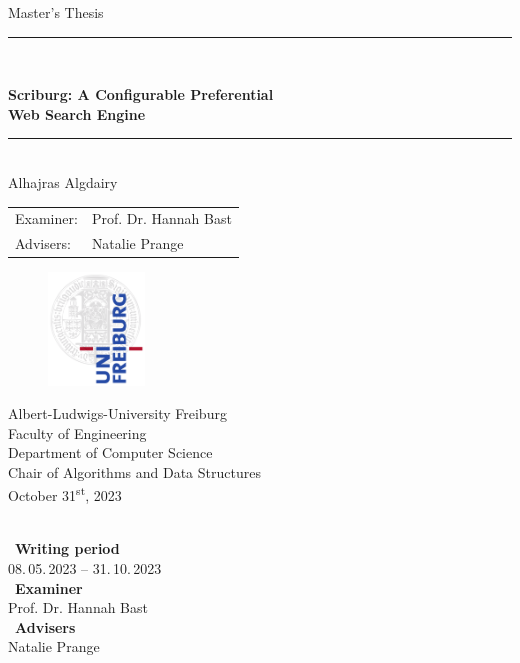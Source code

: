 
\begin{titlepage}
\begin{center}

\newcommand{\HorizontalLine}{\rule{\linewidth}{0.3mm}}

{\Large Master's Thesis}\\[1cm]


\HorizontalLine \\[0.4cm]
\begin{spacing}{3}
    {\huge \bfseries Scriburg: A Configurable Preferential} \\
    {\huge \bfseries  Web Search Engine} \\
\end{spacing}
\HorizontalLine \\[1.5cm]


{\Huge Alhajras Algdairy} \\[1cm]


\begin{tabular}[hc]{>{\huge}l >{\huge}l}
  Examiner: & Prof. Dr. Hannah Bast \\[0.3cm]
  Advisers: & Natalie Prange \\[0.5cm]
\end{tabular}

\begin{figure}[h]	
     \centering
         \includegraphics[height=3cm]{figures/freiburg.png}
\end{figure}

\vfill  %

\Large {
    Albert-Ludwigs-University Freiburg\\
    Faculty of Engineering\\
    Department of Computer Science\\
    Chair of Algorithms and Data Structures\\[1cm]

    October 31\textsuperscript{st}, 2023\\
}
\end{center}
\end{titlepage}

\ \vfill \ \\  %
\
\textbf{Writing period}            \smallskip{} \\
08.\,05.\,2023 -- 31.\,10.\,2023   \bigskip{} \\
\
\textbf{Examiner}                  \smallskip{} \\
Prof. Dr. Hannah Bast               \bigskip{} \\
\
\textbf{Advisers}                  \smallskip{} \\
Natalie Prange

